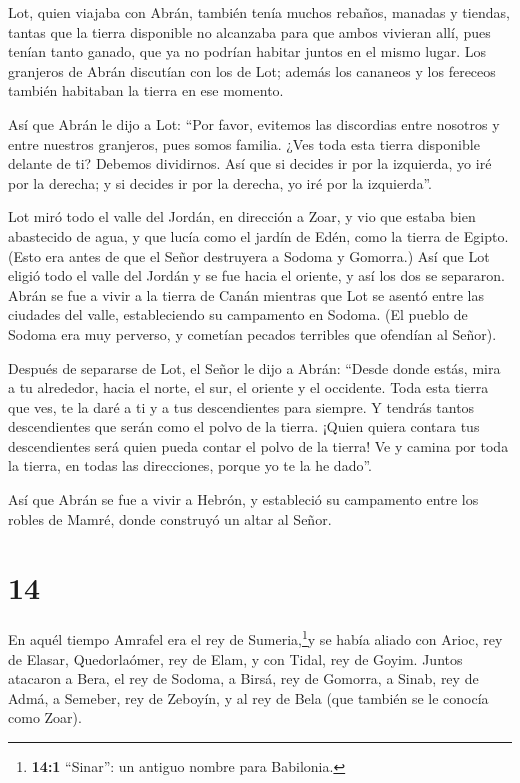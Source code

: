  Lot, quien viajaba con Abrán, también tenía muchos rebaños,
manadas y tiendas,  tantas que la tierra disponible no
alcanzaba para que ambos vivieran allí, pues tenían tanto ganado, que ya
no podrían habitar juntos en el mismo lugar.  Los granjeros
de Abrán discutían con los de Lot; además los cananeos y los fereceos
también habitaban la tierra en ese momento.

 Así que Abrán le dijo a Lot: ``Por favor, evitemos las
discordias entre nosotros y entre nuestros granjeros, pues somos
familia.  ¿Ves toda esta tierra disponible delante de ti?
Debemos dividirnos. Así que si decides ir por la izquierda, yo iré por
la derecha; y si decides ir por la derecha, yo iré por la izquierda''.

 Lot miró todo el valle del Jordán, en dirección a Zoar, y
vio que estaba bien abastecido de agua, y que lucía como el jardín de
Edén, como la tierra de Egipto. (Esto era antes de que el Señor
destruyera a Sodoma y Gomorra.)  Así que Lot eligió todo el
valle del Jordán y se fue hacia el oriente, y así los dos se separaron.
 Abrán se fue a vivir a la tierra de Canán mientras que Lot
se asentó entre las ciudades del valle, estableciendo su campamento en
Sodoma.  (El pueblo de Sodoma era muy perverso, y cometían
pecados terribles que ofendían al Señor).

 Después de separarse de Lot, el Señor le dijo a Abrán:
``Desde donde estás, mira a tu alrededor, hacia el norte, el sur, el
oriente y el occidente.  Toda esta tierra que ves, te la
daré a ti y a tus descendientes para siempre.  Y tendrás
tantos descendientes que serán como el polvo de la tierra. ¡Quien quiera
contara tus descendientes será quien pueda contar el polvo de la tierra!
 Ve y camina por toda la tierra, en todas las direcciones,
porque yo te la he dado''.

 Así que Abrán se fue a vivir a Hebrón, y estableció su
campamento entre los robles de Mamré, donde construyó un altar al Señor.

\hypertarget{section-13}{%
\section{14}\label{section-13}}

 En aquél tiempo Amrafel era el rey de Sumeria,\footnote{\textbf{14:1}
  ``Sinar'': un antiguo nombre para Babilonia.}y se había aliado con
Arioc, rey de Elasar, Quedorlaómer, rey de Elam, y con Tidal, rey de
Goyim.  Juntos atacaron a Bera, el rey de Sodoma, a Birsá,
rey de Gomorra, a Sinab, rey de Admá, a Semeber, rey de Zeboyín, y al
rey de Bela (que también se le conocía como Zoar).

